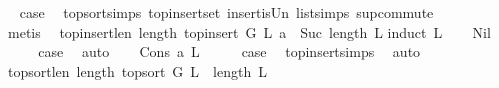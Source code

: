 \begin{isabellebody}
\ \isamarkupfalse%
\ {\isacharquery}{\kern0pt}case\ \isamarkupfalse%
\ top{\isacharunderscore}{\kern0pt}sort{\isachardot}{\kern0pt}simps{\isacharparenleft}{\kern0pt}{}{\isacharparenright}{\kern0pt}\ top{\isacharunderscore}{\kern0pt}insert{\isacharunderscore}{\kern0pt}set\ insert{\isacharunderscore}{\kern0pt}is{\isacharunderscore}{\kern0pt}Un\ list{\isachardot}{\kern0pt}simps{\isacharparenleft}{\kern0pt}{}{}{\isacharparenright}{\kern0pt}\ sup{\isacharunderscore}{\kern0pt}commute\isanewline
\ \ \ \ \isamarkupfalse%
\ {\isacharparenleft}{\kern0pt}metis{\isacharparenright}{\kern0pt}\ \isanewline
{}\isamarkupfalse%
%
\endisatagproof
{\isafoldproof}%
%
\isadelimproof
\isanewline
%
\endisadelimproof
\isanewline
\isanewline
{}\isamarkupfalse%
\ top{\isacharunderscore}{\kern0pt}insert{\isacharunderscore}{\kern0pt}len{\isacharcolon}{\kern0pt}\ {\isachardoublequoteopen}length\ {\isacharparenleft}{\kern0pt}top{\isacharunderscore}{\kern0pt}insert\ G\ L\ a{\isacharparenright}{\kern0pt}\ {\isacharequal}{\kern0pt}\ Suc\ {\isacharparenleft}{\kern0pt}length\ L{\isacharparenright}{\kern0pt}{\isachardoublequoteclose}\isanewline
%
\isadelimproof
%
\endisadelimproof
%
\isatagproof
{}\isamarkupfalse%
{\isacharparenleft}{\kern0pt}induct\ L{\isacharparenright}{\kern0pt}\isanewline
\ \ \isamarkupfalse%
\ Nil\isanewline
\ \ \isamarkupfalse%
\ \isamarkupfalse%
\ {\isacharquery}{\kern0pt}case\ \isamarkupfalse%
\ auto\isanewline
{}\isamarkupfalse%
\isanewline
\ \ \isamarkupfalse%
\ {\isacharparenleft}{\kern0pt}Cons\ a\ L{\isacharparenright}{\kern0pt}\isanewline
\ \ \isamarkupfalse%
\ \isamarkupfalse%
\ {\isacharquery}{\kern0pt}case\ \isamarkupfalse%
\ top{\isacharunderscore}{\kern0pt}insert{\isachardot}{\kern0pt}simps{\isacharparenleft}{\kern0pt}{}{\isacharparenright}{\kern0pt}\ \isamarkupfalse%
\ auto\isanewline
{}\isamarkupfalse%
%
\endisatagproof
{\isafoldproof}%
%
\isadelimproof
\isanewline
%
\endisadelimproof
\isanewline
{}\isamarkupfalse%
\ top{\isacharunderscore}{\kern0pt}sort{\isacharunderscore}{\kern0pt}len{\isacharcolon}{\kern0pt}\ {\isachardoublequoteopen}length\ {\isacharparenleft}{\kern0pt}top{\isacharunderscore}{\kern0pt}sort\ G\ L{\isacharparenright}{\kern0pt}\ {\isacharequal}{\kern0pt}\ length\ L{\isachardoublequoteclose}\isanewline
%

\end{isabellebody}
